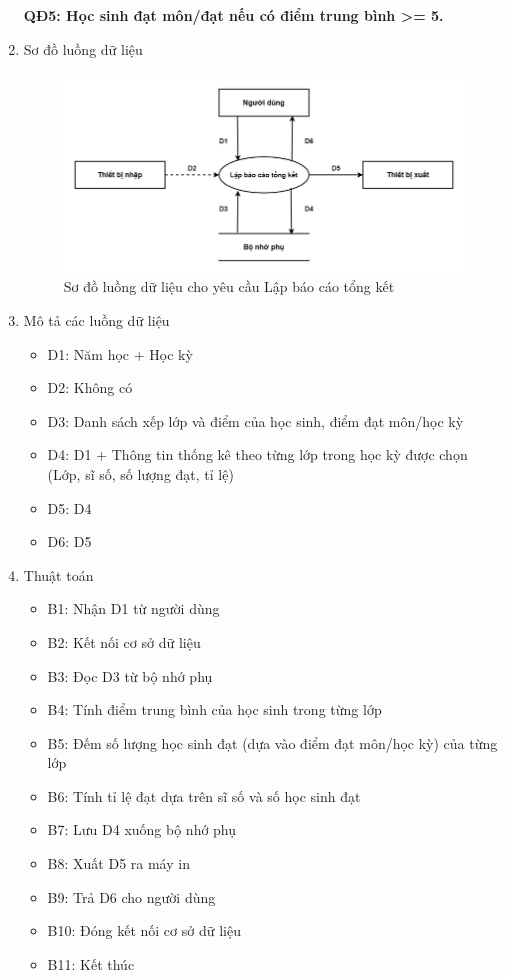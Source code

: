 \documentclass[a4paper]{article}
\begin{document}
\begin{enumerate}[label=\alph*.]
\textbf{QĐ5: Học sinh đạt môn/đạt nếu có điểm trung bình >= 5. } 	
\item Sơ đồ luồng dữ liệu
\begin{figure}[H] 
    \centering
    \includegraphics[width=1\textwidth]{dfd5} %
    \caption{Sơ đồ luồng dữ liệu cho yêu cầu Lập báo cáo tổng kết }
    \label{fig:example} %
\end{figure}	
\item Mô tả các luồng dữ liệu
\begin{itemize}
\item D1: Năm học + Học kỳ
\item D2: Không có
\item D3: Danh sách xếp lớp và điểm của học sinh, điểm đạt môn/học kỳ
\item D4: D1 + Thông tin thống kê theo từng lớp trong học kỳ được chọn (Lớp, sĩ số, số lượng đạt, tỉ lệ)
\item D5: D4
\item D6: D5

\end{itemize}
\item Thuật toán
\begin{itemize}
\item B1: Nhận D1 từ người dùng
\item B2: Kết nối cơ sở dữ liệu
\item B3: Đọc D3 từ bộ nhớ phụ
\item B4: Tính điểm trung bình của học sinh trong từng lớp
\item B5: Đếm số lượng học sinh đạt (dựa vào điểm đạt môn/học kỳ) của từng lớp
\item B6: Tính tỉ lệ đạt dựa trên sĩ số và số học sinh đạt
\item B7: Lưu D4 xuống bộ nhớ phụ
\item B8: Xuất D5 ra máy in
\item B9: Trả D6 cho người dùng
\item B10: Đóng kết nối cơ sở dữ liệu
\item B11: Kết thúc
\end{itemize}

\end{enumerate}	
			
\end{document}
